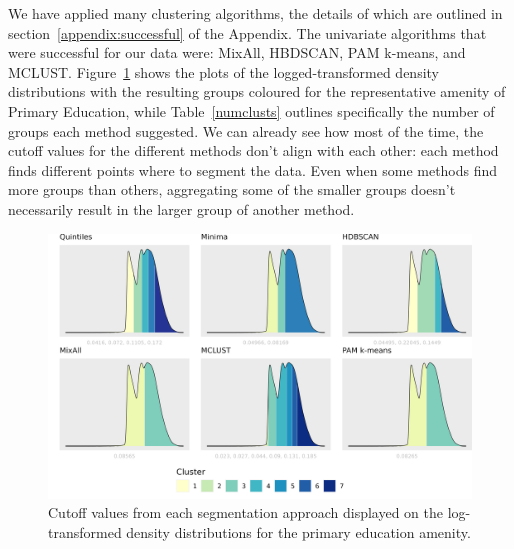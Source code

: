 \documentclass[11pt, a4paper]{article}
\begin{document}
We have applied many clustering algorithms, the details of which are outlined in section~\ref{appendix:successful} of the Appendix. The univariate algorithms that were successful for our data were: MixAll, HBDSCAN, PAM k-means, and MCLUST. Figure~\ref{prieduccutoffs} shows the plots of the logged-transformed density distributions with the resulting groups coloured for the representative amenity of Primary Education, while Table~\ref{numclusts} outlines specifically the number of groups each method suggested. We can already see how most of the time, the cutoff values for the different methods don’t align with each other: each method finds different points where to segment the data. Even when some methods find more groups than others, aggregating some of the smaller groups doesn't necessarily result in the larger group of another method.





\begin{figure}[H]
\centering
\includegraphics[width=\textwidth]{./cutoffs/by_amenity/Primary Education_cutoffs.png}
\caption[Primary education cutoffs]{Cutoff values from each segmentation approach displayed on the log-transformed density distributions for the primary education amenity.}\label{prieduccutoffs}
\end{figure}
\end{document}
